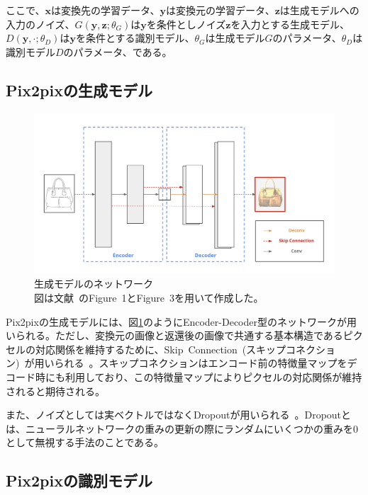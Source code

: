 ここで、$\boldsymbol{x}$は変換先の学習データ、$\boldsymbol{y}$は変換元の学習データ、$\boldsymbol{z}$は生成モデルへの入力のノイズ、$G(\boldsymbol{y},\boldsymbol{z};\theta_G)$は$\boldsymbol{y}$を条件としノイズ$\boldsymbol{z}$を入力とする生成モデル、$D(\boldsymbol{y},\cdot;\theta_D)$は$\boldsymbol{y}$を条件とする識別モデル、$\theta_G$は生成モデル$G$のパラメータ、$\theta_D$は識別モデル$D$のパラメータ、である。

\subsection{Pix2pixの生成モデル}

\begin{figure}[t]
\begin{center}
\includegraphics[width=0.95\hsize]{figure/u-net.png}
\caption{生成モデルのネットワーク\\
図は文献~\cite{pix2pix}のFigure~1とFigure~3を用いて作成した。}
\label{fig:u-net}
\end{center}
\end{figure}

Pix2pixの生成モデルには、図\ref{fig:u-net}のようにEncoder-Decoder型のネットワークが用いられる。ただし、変換元の画像と返還後の画像で共通する基本構造であるピクセルの対応関係を維持するために、Skip~Connection~(スキップコネクション)~が用いられる~\cite{u-net}。スキップコネクションはエンコード前の特徴量マップをデコード時にも利用しており、この特徴量マップによりピクセルの対応関係が維持されると期待される。

また、ノイズとしては実ベクトルではなくDropoutが用いられる~\cite{Dropout}。Dropoutとは、ニューラルネットワークの重みの更新の際にランダムにいくつかの重みを0として無視する手法のことである。

\subsection{Pix2pixの識別モデル}

